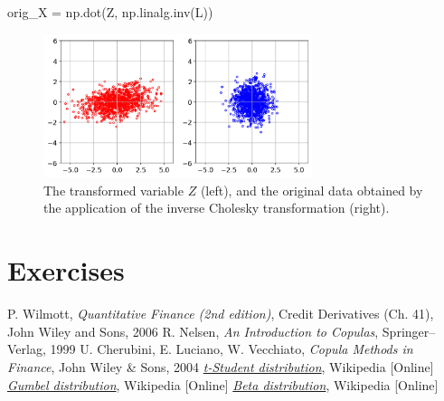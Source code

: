 \begin{ipython}
orig_X = np.dot(Z, np.linalg.inv(L))
\end{ipython}

\begin{figure}[htbp]
  \centering
  \includegraphics[width=0.7\textwidth]{figures/cholesky_inv}
  \caption{The transformed variable $Z$ (left), and the original data obtained by the application of the inverse Cholesky transformation (right).}
  \label{fig:cholesky_inv}
\end{figure}

\section*{Exercises}


\begin{thebibliography}{9}
P. Wilmott, \emph{Quantitative Finance (2nd edition)}, Credit Derivatives (Ch. 41), John Wiley and Sons, 2006 
R. Nelsen, \emph{An Introduction to Copulas}, Springer–Verlag, 1999
U. Cherubini, E. Luciano, W. Vecchiato, \emph{Copula Methods in Finance}, John Wiley \& Sons, 2004
\href{https://en.wikipedia.org/wiki/Student\%27s\_t-distribution}{\emph{t-Student distribution}}, Wikipedia [Online]
\href{https://en.wikipedia.org/wiki/Gumbel_distribution}{\emph{Gumbel distribution}}, Wikipedia [Online]
\href{https://en.wikipedia.org/wiki/Beta_distribution}{\emph{Beta distribution}}, Wikipedia [Online]
\end{thebibliography}
